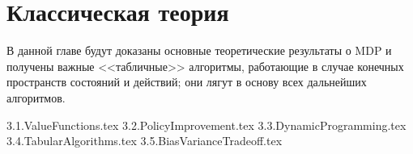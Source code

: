 \documentclass[../main.tex]{subfiles}
\begin{document}
\chapter{Классическая теория}\label{classictheorychapter}

В данной главе будут доказаны основные теоретические результаты о MDP и получены важные <<табличные>> алгоритмы, работающие в случае конечных пространств состояний и действий; они лягут в основу всех дальнейших алгоритмов. 

{3.1.ValueFunctions.tex}
{3.2.PolicyImprovement.tex}
{3.3.DynamicProgramming.tex}
{3.4.TabularAlgorithms.tex}
{3.5.BiasVarianceTradeoff.tex}
\end{document}
